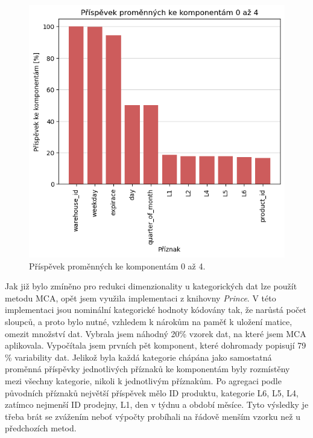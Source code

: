 \begin{figure}[h!]
    \centering
    \includegraphics[width=.8\textwidth]{obrazky/zntb/pca-prispevky.png}
    \caption{Příspěvek proměnných ke komponentám 0 až 4.}
    \label{obr:nb:pca_prispevek}
\end{figure}
    
Jak již bylo zmíněno pro redukci dimenzionality u kategorických dat lze použít metodu MCA, opět jsem využila implementaci z knihovny \emph{Prince}. V této implementaci jsou nominální kategorické hodnoty kódovány tak, že narůstá počet sloupců, a proto bylo nutné, vzhledem k nárokům na paměť k uložení matice, omezit množství dat. Vybrala jsem náhodný 20\% vzorek dat, na které jsem MCA aplikovala. Vypočítala jsem prvních pět komponent, které dohromady popisují 79 \% variability dat. Jelikož byla každá kategorie chápána jako samostatná proměnná příspěvky jednotlivých příznaků ke komponentám byly rozmístěny mezi všechny kategorie, nikoli k jednotlivým příznakům. Po agregaci podle původních příznaků největší příspěvek mělo ID produktu, kategorie L6, L5, L4, zatímco nejmenší ID prodejny, L1, den v týdnu a období měsíce. Tyto výsledky je třeba brát se zvážením neboť výpočty probíhali na řádově menším vzorku než u předchozích metod.


